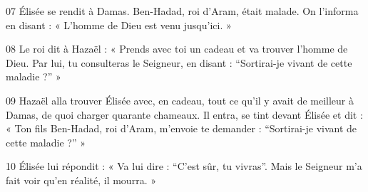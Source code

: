
07 Élisée se rendit à Damas. Ben-Hadad, roi d’Aram, était malade. On l’informa en disant : « L’homme de Dieu est venu jusqu’ici. »

08 Le roi dit à Hazaël : « Prends avec toi un cadeau et va trouver l’homme de Dieu. Par lui, tu consulteras le Seigneur, en disant : “Sortirai-je vivant de cette maladie ?” »

09 Hazaël alla trouver Élisée avec, en cadeau, tout ce qu’il y avait de meilleur à Damas, de quoi charger quarante chameaux. Il entra, se tint devant Élisée et dit : « Ton fils Ben-Hadad, roi d’Aram, m’envoie te demander : “Sortirai-je vivant de cette maladie ?” »

10 Élisée lui répondit : « Va lui dire : “C’est sûr, tu vivras”. Mais le Seigneur m’a fait voir qu’en réalité, il mourra. »